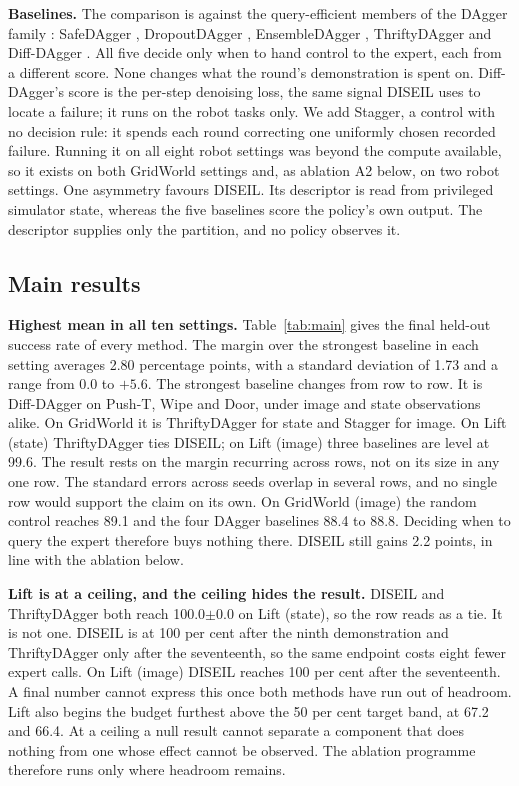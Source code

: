 \noindent\textbf{Baselines.}
The comparison is against the query-efficient members of the DAgger family
\cite{ross2011dagger}: SafeDAgger \cite{zhang2017safedagger}, DropoutDAgger
\cite{menda2017dropoutdagger}, EnsembleDAgger \cite{menda2019ensembledagger},
ThriftyDAgger \cite{hoque2021thriftydagger} and Diff-DAgger
\cite{lee2025diffdagger}. All five decide only when to hand control to the expert,
each from a different score. None changes what the round's demonstration is spent
on. Diff-DAgger's score is the per-step denoising loss, the same signal DISEIL
uses to locate a failure; it runs on the robot tasks only. We add Stagger, a
control with no decision rule: it spends each round correcting one uniformly
chosen recorded failure. Running it on all eight robot settings was beyond the
compute available, so it exists on both GridWorld settings and, as ablation A2
below, on two robot settings. One asymmetry favours DISEIL. Its descriptor is read
from privileged simulator state, whereas the five baselines score the policy's own
output. The descriptor supplies only the partition, and no policy observes it.

\subsection{Main results}

\noindent\textbf{Highest mean in all ten settings.}
Table~\ref{tab:main} gives the final held-out success rate of every method. The
margin over the strongest baseline in each setting averages 2.80 percentage
points, with a standard deviation of 1.73 and a range from 0.0 to $+5.6$. The
strongest baseline
changes from row to row. It is Diff-DAgger on Push-T, Wipe and Door, under image
and state observations alike. On GridWorld it is ThriftyDAgger for state and
Stagger for image. On Lift (state) ThriftyDAgger ties DISEIL; on Lift (image)
three baselines are level at 99.6. The result rests on the margin recurring
across rows, not on its size in any one row. The standard errors across seeds
overlap in several rows, and no single row would support the claim on its own. On
GridWorld (image) the random control reaches 89.1 and the four
DAgger baselines 88.4 to 88.8. Deciding when to query the expert therefore buys
nothing there. DISEIL still gains 2.2 points, in line with the ablation below.

\noindent\textbf{Lift is at a ceiling, and the ceiling hides the result.}
DISEIL and ThriftyDAgger both reach 100.0$\pm$0.0 on Lift (state), so the row
reads as a tie. It is not one. DISEIL is at 100 per cent after the ninth
demonstration and ThriftyDAgger only after the seventeenth, so the same endpoint
costs eight fewer expert calls. On Lift (image) DISEIL reaches 100 per cent after
the seventeenth. A final number cannot express this once both methods have run
out of headroom. Lift also begins the budget furthest above the 50 per cent
target band, at 67.2 and 66.4. At a ceiling a null result cannot separate a
component that does nothing from one whose effect cannot be observed. The
ablation programme therefore runs only where headroom remains.

